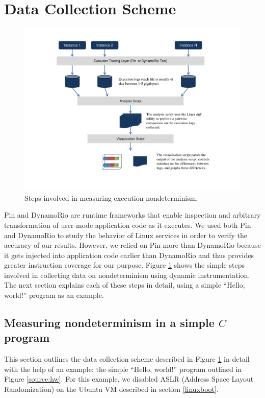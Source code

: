 \section{Data Collection Scheme} \label{datacollection}
\begin{figure}[h]
  \center
  \includegraphics[width=1.0\textwidth, trim=1cm 1cm 1cm 1cm]
                  {naivedatacollection.pdf}
  \caption[Steps involved in measuring execution nondeterminism]%
  {Steps involved in measuring execution nondeterminism.}
  \label{data:naive}
\end{figure}

Pin and DynamoRio are runtime frameworks that enable inspection
and arbitrary transformation of user-mode application code as it executes.
We used both Pin and DynamoRio to study the behavior
of Linux services in order to verify
the accuracy of our results. However, we relied on Pin more 
than DynamoRio because it gets injected into application code
earlier than DynamoRio and thus provides greater
instruction coverage for our purpose.  Figure \ref{data:naive} shows the simple steps involved
in collecting data on nondeterminism using
dynamic instrumentation. The next section 
explains each of these steps in detail, 
using a simple ``Hello, world!'' program as an example.

\subsection{Measuring nondeterminism in a simple $C$ program} \label{ch:hw}
This section outlines the data collection scheme
described in Figure \ref{data:naive} in detail with the help
of an example:  the simple ``Hello, world!'' program
outlined in Figure \ref{source:hw}.
For this example, we disabled ASLR (Address Space Layout
Randomization) on the Ubuntu VM described in section \ref{linuxboot}. \newline

